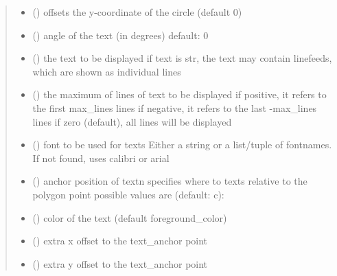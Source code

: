 \documentclass[letterpaper,10pt,english]{sphinxmanual}
\begin{document}
\begin{fulllineitems}
\begin{quote}
\begin{description}
\begin{itemize}
\item {} 
 () \textendash{} offsets the y-coordinate of the circle (default 0)

\item {} 
 () \textendash{} angle of the text (in degrees) 
default: 0

\item {} 
 (\sphinxstyleliteralemphasis{, }) \textendash{} the text to be displayed 
if text is str, the text may contain linefeeds, which are shown as individual lines

\item {} 
 () \textendash{} the maximum of lines of text to be displayed 
if positive, it refers to the first max\_lines lines 
if negative, it refers to the last -max\_lines lines 
if zero (default), all lines will be displayed

\item {} 
 () \textendash{} font to be used for texts 
Either a string or a list/tuple of fontnames.
If not found, uses calibri or arial

\item {} 
 () \textendash{} anchor position of text\textbar{}n\textbar{}
specifies where to texts relative to the polygon
point 
possible values are (default: c): 

\item {} 
 () \textendash{} color of the text (default foreground\_color)

\item {} 
 () \textendash{} extra x offset to the text\_anchor point

\item {} 
 () \textendash{} extra y offset to the text\_anchor point


\end{itemize}
\end{description}
\end{quote}
\end{fulllineitems}
\end{document}
